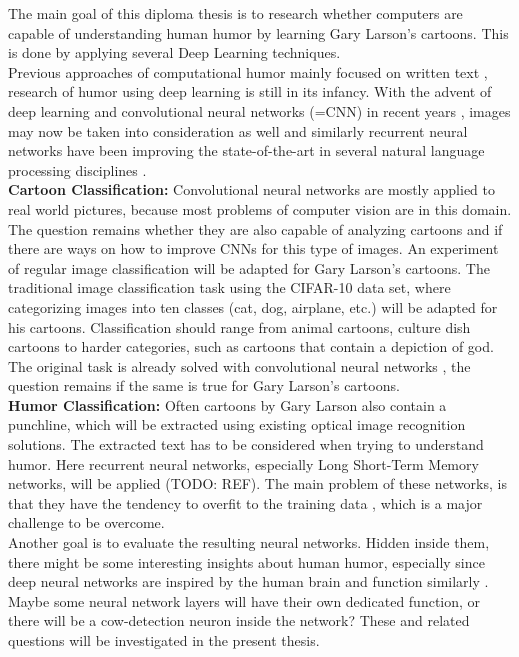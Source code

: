 \documentclass[draft,final,oneside]{vutinfth} %
\begin{document}
The main goal of this diploma thesis is to research whether computers are capable of understanding human humor by learning Gary Larson's cartoons. This is done by applying several Deep Learning techniques. \\


Previous approaches of computational humor mainly focused on written text \cite{Yang2015HumorRA}\cite{Bamman2015ContextualizedSD}\cite{HumoristBot}, research of humor using deep learning is still in its infancy. With the advent of deep learning and convolutional neural networks (=CNN) in recent years \cite{Druzhkov2016}, images may now be taken into consideration as well and similarly recurrent neural networks have been improving the state-of-the-art in several natural language processing disciplines \cite{reviewRNN}. \\

\textbf {Cartoon Classification:} \quad Convolutional neural networks are mostly applied to real world pictures, because most problems of computer vision are in this domain. The question remains whether they are also capable of analyzing cartoons and if there are ways on how to improve CNNs for this type of images. An experiment of regular image classification will be adapted for Gary Larson's cartoons. The traditional image classification task using the CIFAR-10 data set, where categorizing images into ten classes (cat, dog, airplane, etc.) will be adapted for his cartoons. Classification should range from animal cartoons, culture dish cartoons to harder categories, such as cartoons that contain a depiction of god. The original task is already solved with convolutional neural networks \cite{dogsvscats}, the question remains if the same is true for Gary Larson's cartoons. \\

\textbf {Humor Classification:} \quad Often cartoons by Gary Larson also contain a punchline, which will be extracted using existing optical image recognition solutions. The extracted text has to be considered when trying to understand humor. Here recurrent neural networks, especially Long Short-Term Memory networks, will be applied (TODO: REF). The main problem of these networks, is that they have the tendency to overfit to the training data \cite[page 4]{reviewRNN}, which is a major challenge to be overcome. \\

Another goal is to evaluate the resulting neural networks. Hidden inside them, there might be some interesting insights about human humor, especially since deep neural networks are inspired by the human brain and function similarly \cite{Cichy2016}. Maybe some neural network layers will have their own dedicated function, or there will be a cow-detection neuron inside the network? These and related questions will be investigated in the present thesis.
\end{document}
